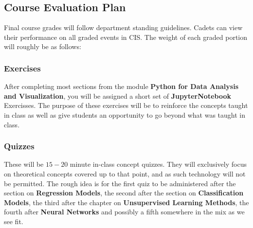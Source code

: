 \documentclass[11pt]{article}
\theoremstyle{plain}
\theoremstyle{definition}
\begin{document}
\subsection{Course Evaluation Plan}

Final course grades will follow department standing guidelines. Cadets can view their performance on all graded events in CIS. 
\vskip 8pt
The weight of each graded portion will roughly be as follows:


\begin{table}[!h]
\begin{center}
\end{center}
\end{table}

\subsubsection{Exercises}

After completing most sections from the module {\bf Python for Data Analysis and Visualization}, you will be assigned a short set of {\bf JupyterNotebook} Exercisses. The purpose of these exercises will be to reinforce the concepts taught in class as well as give students an opportunity to go beyond what was taught in class. 

\subsubsection{Quizzes}

These will be $15-20$ minute in-class concept quizzes. They will exclusively focus on theoretical concepts covered up to that point, and as such technology will not be permitted. The rough idea is for the first quiz to be administered after the section on {\bf Regression Models}, the second after the section on {\bf Classification Models}, the third after the chapter on {\bf Unsupervised Learning Methods}, the fourth after {\bf Neural Networks} and possibly a fifth somewhere in the mix as we see fit. 
\end{document}
